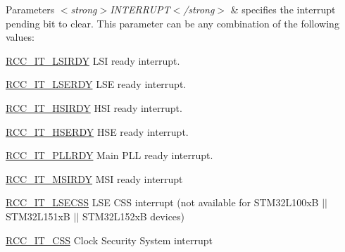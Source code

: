 \begin{DoxyParams}{Parameters}
{\em $<$strong$>$\-I\-N\-T\-E\-R\-R\-U\-P\-T$<$/strong$>$} & specifies the interrupt pending bit to clear. This parameter can be any combination of the following values\-: \begin{DoxyItemize}
\item \hyperlink{group___r_c_c___interrupt_ga2b4ef277c1b71f96e0bef4b9a72fca94}{R\-C\-C\-\_\-\-I\-T\-\_\-\-L\-S\-I\-R\-D\-Y} L\-S\-I ready interrupt. \item \hyperlink{group___r_c_c___interrupt_gad6b6e78a426850f595ef180d292a673d}{R\-C\-C\-\_\-\-I\-T\-\_\-\-L\-S\-E\-R\-D\-Y} L\-S\-E ready interrupt. \item \hyperlink{group___r_c_c___interrupt_ga69637e51b71f73f519c8c0a0613d042f}{R\-C\-C\-\_\-\-I\-T\-\_\-\-H\-S\-I\-R\-D\-Y} H\-S\-I ready interrupt. \item \hyperlink{group___r_c_c___interrupt_gad13eaede352bca59611e6cae68665866}{R\-C\-C\-\_\-\-I\-T\-\_\-\-H\-S\-E\-R\-D\-Y} H\-S\-E ready interrupt. \item \hyperlink{group___r_c_c___interrupt_ga68d48e7811fb58f2649dce6cf0d823d9}{R\-C\-C\-\_\-\-I\-T\-\_\-\-P\-L\-L\-R\-D\-Y} Main P\-L\-L ready interrupt. \item \hyperlink{group___r_c_c___interrupt_gae0cfda620ac8949e5b266661dba7ba0a}{R\-C\-C\-\_\-\-I\-T\-\_\-\-M\-S\-I\-R\-D\-Y} M\-S\-I ready interrupt \item \hyperlink{group___r_c_c___interrupt_gaf3f259914cb56820b1649c9d4413736c}{R\-C\-C\-\_\-\-I\-T\-\_\-\-L\-S\-E\-C\-S\-S} L\-S\-E C\-S\-S interrupt (not available for S\-T\-M32\-L100x\-B $\vert$$\vert$ S\-T\-M32\-L151x\-B $\vert$$\vert$ S\-T\-M32\-L152x\-B devices) \item \hyperlink{group___r_c_c___interrupt_ga9bb34a4912d2084dc1c0834eb53aa7a3}{R\-C\-C\-\_\-\-I\-T\-\_\-\-C\-S\-S} Clock Security System interrupt \end{DoxyItemize}
\\
\hline
\end{DoxyParams}
